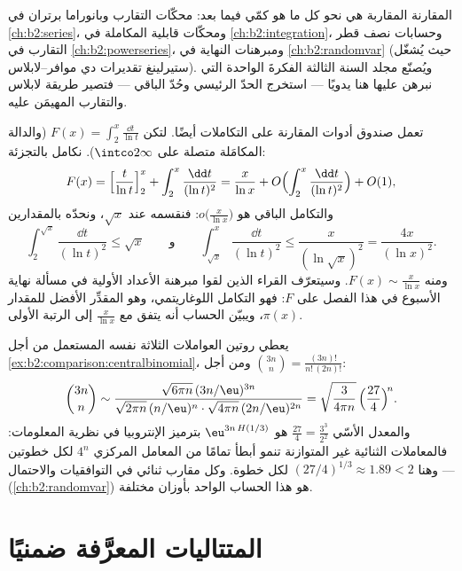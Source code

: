 \begin{remark}
المقارنة المقاربة هي نحو كل ما هو كمّي
فيما بعد: محكّات التقارب وبانوراما برتران في
\cref{ch:b2:series}، ومحكّات قابلية المكاملة في
\cref{ch:b2:integration}، وحسابات نصف قطر التقارب
في \cref{ch:b2:powerseries}، ومبرهنات النهاية في
\cref{ch:b2:randomvar} (حيث يُشغّل ستيرلينغ تقديرات
دي موافر--لابلاس). ويُصنّع مجلد السنة الثالثة الفكرةَ الواحدة
التي نبرهن عليها هنا يدويًا --- استخرج الحدّ الرئيسي وحُدّ
الباقي --- فتصير طريقة لابلاس والتقارب المهيمَن عليه.
\end{remark}

\begin{example}\label{ex:b2:comparison:liworked}
تعمل صندوق أدوات المقارنة على التكاملات أيضًا. لتكن $F(x) =
\int_2^x\frac{\dd t}{\ln t}$ (والدالة المكامَلة متصلة على
$\intco2\infty$). نكامل بالتجزئة:
\[
F(x) = \Bigl[\frac{t}{\ln t}\Bigr]_2^x +
\int_2^x\frac{\dd t}{(\ln t)^2}
= \frac{x}{\ln x} + O\Bigl(\int_2^x\frac{\dd t}{(\ln
t)^2}\Bigr) + O(1),
\]
والتكامل الباقي هو $o\bigl(\frac{x}{\ln x}\bigr)$:
فنقسمه عند $\sqrt x$، ونحدّه بالمقدارين
\[
\int_2^{\sqrt x}\frac{\dd t}{(\ln t)^2} \leq \sqrt x
\qquad\text{و}\qquad
\int_{\sqrt x}^{x}\frac{\dd t}{(\ln t)^2} \leq
\frac{x}{(\ln\sqrt x)^2} = \frac{4x}{(\ln x)^2} .
\]
ومنه $F(x) \sim \frac{x}{\ln x}$. وسيتعرّف القراء الذين لقوا
مبرهنة الأعداد الأولية في مسألة نهاية الأسبوع في هذا الفصل على
$F$: فهو التكامل اللوغاريتمي، وهو المقدِّر الأفضل
للمقدار $\pi(x)$، ويبيّن الحساب أنه يتفق مع
$\frac{x}{\ln x}$ إلى الرتبة الأولى.
\end{example}

\begin{example}\label{ex:b2:comparison:lopsided}
يعطي روتين العواملات الثلاثة نفسه المستعمل من أجل
\cref{ex:b2:comparison:centralbinomial}، ومن أجل
$\binom{3n}{n} = \frac{(3n)!}{n!\,(2n)!}$:
\[
\binom{3n}{n} \sim
\frac{\sqrt{6\pi n}\,(3n/\eu)^{3n}}
{\sqrt{2\pi n}\,(n/\eu)^{n}\cdot\sqrt{4\pi n}\,(2n/\eu)^{2n}}
= \sqrt{\frac{3}{4\pi n}}\,
\Bigl(\frac{27}{4}\Bigr)^{\!n} .
\]
والمعدل الأسّي $\frac{27}4 = \frac{3^3}{2^2}$ هو
$\eu^{3n\,H(1/3)}$ بترميز الإنتروبيا في نظرية
المعلومات: فالمعاملات الثنائية غير المتوازنة تنمو أبطأ تمامًا من
المعامل المركزي $4^n$ لكل خطوتين --- وهنا $(27/4)^{1/3} \approx 1.89 < 2$ لكل
خطوة. وكل مقارب ثنائي في التوافقيات والاحتمال
(\cref{ch:b2:randomvar}) هو هذا الحساب الواحد بأوزان مختلفة.
\end{example}

\section{المتتاليات المعرَّفة ضمنيًا}

